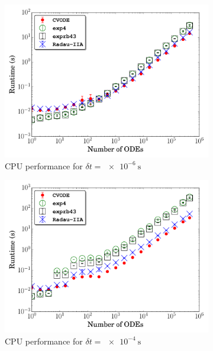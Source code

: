 \documentclass[preprint,review,11pt]{elsarticle}
\begin{document}
\begin{figure}[htb]
  \centering
  \begin{subfigure}{0.49\textwidth}
      \includegraphics[width=\linewidth]{CH4_1e-06_cpu_nonorm.pdf}
      \caption{CPU performance for $\delta t = \SI{e-6}{\second}$}
  \end{subfigure}
  \begin{subfigure}{0.49\textwidth}
      \includegraphics[width=\linewidth]{CH4_1e-04_cpu_nonorm.pdf}
      \caption{CPU performance for $\delta t = \SI{e-4}{\second}$}
  \end{subfigure}\\
  \begin{subfigure}{0.49\textwidth}

\end{subfigure}
\end{figure}
\end{document}
